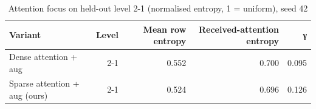 \begin{table}[t]
\centering
\caption{Attention focus on held-out level 2-1 (normalised entropy, 1 = uniform), seed 42}
\label{tab:attention_entropy}
\begin{tabular}{lrrrr}
\toprule
Variant & Level & Mean row entropy & Received-attention entropy & γ \\
\midrule
Dense attention + aug & 2-1 & 0.552 & 0.700 & 0.095 \\
Sparse attention + aug (ours) & 2-1 & 0.524 & 0.696 & 0.126 \\
\bottomrule
\end{tabular}
\end{table}
